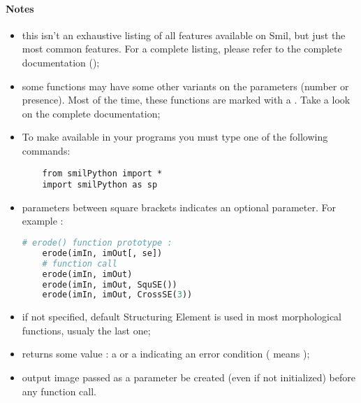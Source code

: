 
\paragraph*{Notes}
\begin{itemize}
  \setlength\itemsep{0em}
  \item this isn't an exhaustive listing of all features available on Smil, but just the most common features. For a complete listing, please refer to the complete documentation ();

  \item some functions may have some other variants on the parameters (number or presence). Most of the time, these functions are marked with a . Take a look on the complete documentation;


  \item To make  available in your programs you must type one of the following commands:
    \begin{lstlisting}
    from smilPython import *
    import smilPython as sp
    \end{lstlisting}

  \item parameters between square brackets indicates an optional parameter. For example :
    \begin{lstlisting}[language=Python]
    # erode() function prototype : 
    erode(imIn, imOut[, se])
    # function call
    erode(imIn, imOut)
    erode(imIn, imOut, SquSE())
    erode(imIn, imOut, CrossSE(3))
    \end{lstlisting}

  \item if not specified, default Structuring Element is used in most morphological functions, usualy the last one;

  \item {} returns some value : a  or a  indicating an error condition ( means );

  \item output image passed as a parameter  be created (even if not initialized) before any function call.

\end{itemize}
